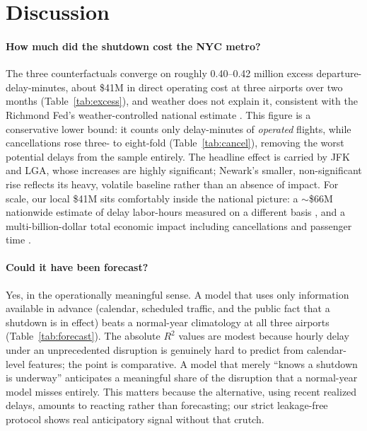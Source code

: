 \documentclass[10pt,journal]{IEEEtran}
\begin{document}
\section{Discussion}
\label{sec:discussion}

\paragraph{How much did the shutdown cost the NYC metro?}
The three counterfactuals converge on roughly 0.40--0.42 million excess
departure-delay-minutes, about \$41M in direct operating cost at three airports
over two months (Table~\ref{tab:excess}), and weather does not explain it,
consistent with the Richmond Fed's weather-controlled national estimate
\cite{richmondfed2025}. This figure is a conservative lower bound: it counts
only delay-minutes of \emph{operated} flights, while cancellations rose three-
to eight-fold (Table~\ref{tab:cancel}), removing the worst potential delays
from the sample entirely. The headline effect is carried by JFK and LGA, whose
increases are highly significant; Newark's smaller, non-significant rise
reflects its heavy, volatile baseline rather than an absence of impact. For
scale, our local \$41M sits comfortably inside the national picture: a
$\sim$\$66M nationwide estimate of delay labor-hours measured on a different
basis \cite{richmondfed2025}, and a multi-billion-dollar total economic impact
including cancellations and passenger time \cite{ctp2026}.

\paragraph{Could it have been forecast?}
Yes, in the operationally meaningful sense. A model that uses only information
available in advance (calendar, scheduled traffic, and the public fact that a
shutdown is in effect) beats a normal-year climatology at all three airports
(Table~\ref{tab:forecast}). The absolute $R^2$ values are modest because hourly
delay under an unprecedented disruption is genuinely hard to predict from
calendar-level features; the point is comparative. A model that merely ``knows a
shutdown is underway'' anticipates a meaningful share of the disruption that a
normal-year model misses entirely. This matters because the
alternative, using recent realized delays, amounts to reacting rather than
forecasting; our strict leakage-free protocol shows real anticipatory signal
without that crutch.
\end{document}
